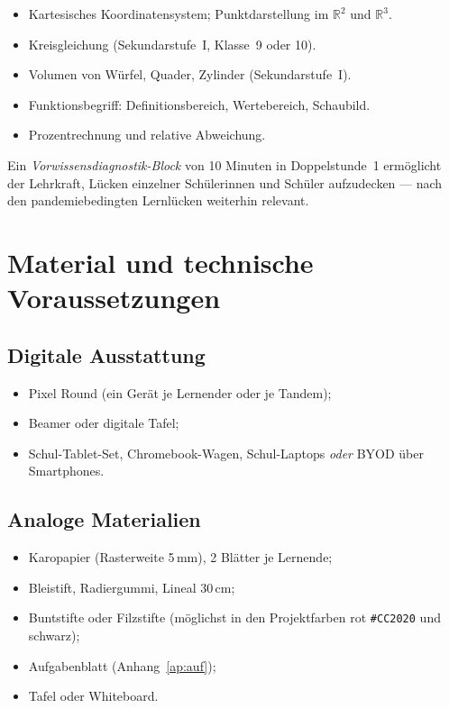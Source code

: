 \documentclass[12pt,a4paper]{scrartcl}
\begin{document}
\begin{itemize}[leftmargin=1.3em,itemsep=0.15em,topsep=0.3em]
  \item Kartesisches Koordinatensystem; Punktdarstellung im $\mathbb{R}^2$ und $\mathbb{R}^3$.
  \item Kreisgleichung (Sekundarstufe~I, Klasse~9 oder 10).
  \item Volumen von Würfel, Quader, Zylinder (Sekundarstufe~I).
  \item Funktionsbegriff: Definitionsbereich, Wertebereich, Schaubild.
  \item Prozentrechnung und relative Abweichung.
\end{itemize}

Ein \emph{Vorwissensdiagnostik-Block} von 10 Minuten in Doppelstunde~1 ermöglicht der Lehrkraft, Lücken einzelner Schülerinnen und Schüler aufzudecken --- nach den pandemiebedingten Lernlücken weiterhin relevant.

\section{Material und technische Voraussetzungen}

\subsection{Digitale Ausstattung}
\begin{itemize}[leftmargin=1.3em,itemsep=0.15em,topsep=0.3em]
  \item Pixel Round (ein Gerät je Lernender oder je Tandem);
  \item Beamer oder digitale Tafel;
  \item Schul-Tablet-Set, Chromebook-Wagen, Schul-Laptops \emph{oder} BYOD über Smartphones.
\end{itemize}

\subsection{Analoge Materialien}
\begin{itemize}[leftmargin=1.3em,itemsep=0.15em,topsep=0.3em]
  \item Karopapier (Rasterweite 5\,mm), 2 Blätter je Lernende;
  \item Bleistift, Radiergummi, Lineal 30\,cm;
  \item Buntstifte oder Filzstifte (möglichst in den Projektfarben rot \texttt{\#CC2020} und schwarz);
  \item Aufgabenblatt (Anhang~\ref{ap:auf});
  \item Tafel oder Whiteboard.
\end{itemize}
\end{document}
